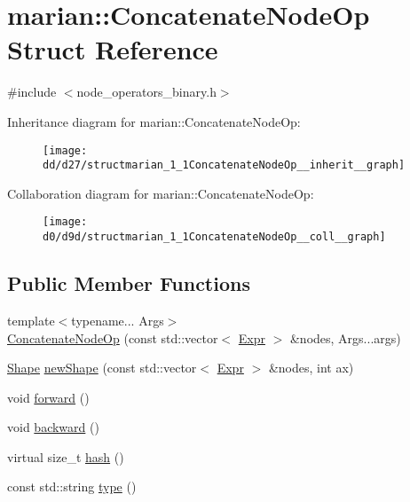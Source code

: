 \hypertarget{structmarian_1_1ConcatenateNodeOp}{}\section{marian\+:\+:Concatenate\+Node\+Op Struct Reference}
\label{structmarian_1_1ConcatenateNodeOp}


{\ttfamily \#include $<$node\+\_\+operators\+\_\+binary.\+h$>$}



Inheritance diagram for marian\+:\+:Concatenate\+Node\+Op\+:
\nopagebreak
\begin{figure}[H]
\begin{center}
\leavevmode
\texttt{[image: dd/d27/structmarian\_1\_1ConcatenateNodeOp\_\_inherit\_\_graph]}
\end{center}
\end{figure}


Collaboration diagram for marian\+:\+:Concatenate\+Node\+Op\+:
\nopagebreak
\begin{figure}[H]
\begin{center}
\leavevmode
\texttt{[image: d0/d9d/structmarian\_1\_1ConcatenateNodeOp\_\_coll\_\_graph]}
\end{center}
\end{figure}
\subsection*{Public Member Functions}
\begin{DoxyCompactItemize}
\item 
{\footnotesize template$<$typename... Args$>$ }\\\hyperlink{structmarian_1_1ConcatenateNodeOp_a04e7182f5fbee8312008a4fdfec98c35}{Concatenate\+Node\+Op} (const std\+::vector$<$ \hyperlink{namespacemarian_a498d8baf75b754011078b890b39c8e12}{Expr} $>$ \&nodes, Args...\+args)
\item 
\hyperlink{structmarian_1_1Shape}{Shape} \hyperlink{structmarian_1_1ConcatenateNodeOp_a7e9ce31c059ea7f61e778c16fbb62e2c}{new\+Shape} (const std\+::vector$<$ \hyperlink{namespacemarian_a498d8baf75b754011078b890b39c8e12}{Expr} $>$ \&nodes, int ax)
\item 
void \hyperlink{structmarian_1_1ConcatenateNodeOp_abf66689ce65575ad5593ba1f68db74c3}{forward} ()
\item 
void \hyperlink{structmarian_1_1ConcatenateNodeOp_a256bf52a8e098dddcdeddacb39e55929}{backward} ()
\item 
virtual size\+\_\+t \hyperlink{structmarian_1_1ConcatenateNodeOp_ade186966864e82498336129c608ab280}{hash} ()
\item 
const std\+::string \hyperlink{structmarian_1_1ConcatenateNodeOp_ac1d53d75ef0fa4c851ea58cec367db18}{type} ()
\end{DoxyCompactItemize}
